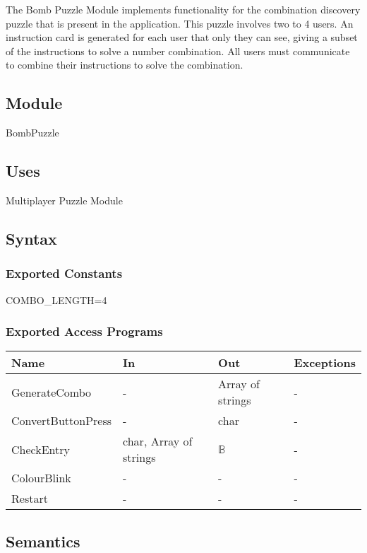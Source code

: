 \documentclass[12pt, titlepage]{article}
\begin{document}
\noindent The Bomb Puzzle Module implements functionality for the combination discovery puzzle that is present in the application. This puzzle involves two to 4 users. An instruction card is generated for each user that only they can see, giving a subset of the instructions to solve a number combination. All users must communicate to combine their instructions to solve the combination.

\subsection{Module}
BombPuzzle

\subsection{Uses}
Multiplayer Puzzle Module

\subsection{Syntax}

\subsubsection{Exported Constants}
COMBO\_LENGTH=4

\subsubsection{Exported Access Programs}

\begin{center}
\begin{tabular}{p{5cm} p{4cm} p{4cm} p{2cm}}
\hline
\textbf{Name} & \textbf{In} & \textbf{Out} & \textbf{Exceptions} \\
\hline
GenerateCombo & - & Array of strings & - \\
ConvertButtonPress & - & char & - \\
CheckEntry & char, Array of strings & $\mathds{B}$ & - \\
ColourBlink & - & - & - \\
Restart & - & - & - \\
\hline
\end{tabular}
\end{center}

\subsection{Semantics}
\end{document}
